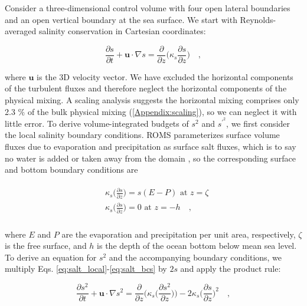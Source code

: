 \documentclass[draft]{agujournal2019}
\begin{document}
Consider a three-dimensional control volume with four open lateral boundaries and an open vertical boundary at the sea surface. We start with Reynolds-averaged salinity conservation in Cartesian coordinates:
\begin{linenomath*}
\begin{equation} \label{eq:salt_local}
    \frac{\partial s}{\partial t}+ \textbf{u} \cdot \nabla s = \frac{\partial}{\partial z} \bigg(\kappa_s {\frac{\partial s}{\partial z}} \bigg) \quad ,
\end{equation}
\end{linenomath*}
where $\textbf{u}$ is the 3D velocity vector. We have excluded the horizontal components of the turbulent fluxes and therefore neglect the horizontal components of the physical mixing. A scaling analysis suggests the horizontal mixing comprises only 2.3 $\%$ of the bulk physical mixing (\ref{Appendix:scaling}), so we can neglect it with little error. To derive volume-integrated budgets of $s^2$ and $s^{\prime^2}$, we first consider the local salinity boundary conditions. ROMS parameterizes surface volume fluxes due to evaporation and precipitation as surface salt fluxes, which is to say no water is added or taken away from the domain \cite{shchepetkin2005regional}, so the corresponding surface and bottom boundary conditions are
\begin{linenomath*}
\begin{align} \label{eq:salt_bcs}
    \begin{split}
        & \kappa_s \bigg({\frac{\partial s}{\partial z}} \bigg) = s(E-P) \,\, \textrm{at} \,\, z = \zeta \\
        & \kappa_s \bigg({\frac{\partial s}{\partial z}} \bigg) = 0 \,\, \textrm{at} \,\, z = -h \quad , \\
    \end{split}
\end{align} 
\end{linenomath*}
where $E$ and $P$ are the evaporation and precipitation per unit area, respectively, $\zeta$ is the free surface, and $h$ is the depth of the ocean bottom below mean sea level. To derive an equation for $s^2$ and the accompanying boundary conditions, we multiply Eqs. \ref{eq:salt_local}-\ref{eq:salt_bcs} by $2s$ and apply the product rule:
\begin{linenomath*}
\begin{equation} \label{eq:s2_local}
    \frac{\partial s^2}{\partial t} + \textbf{u} \cdot \nabla s^2   = \frac{\partial}{\partial z} \bigg(\kappa_s \bigg(\frac{\partial s^2}{\partial z} \bigg) \bigg) -2 \kappa_s \bigg(\frac{\partial s}{\partial z} \bigg)^2 \quad ,
\end{equation}
\end{linenomath*}
\end{document}

